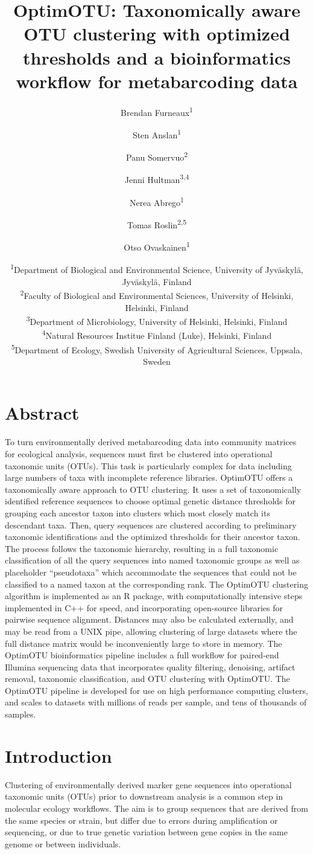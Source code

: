 \documentclass[
]{article}
\title{OptimOTU: Taxonomically aware OTU clustering with optimized thresholds and a bioinformatics workflow for metabarcoding data}
\author{Brendan Furneaux\textsuperscript{1} \and Sten Anslan\textsuperscript{1} \and Panu Somervuo\textsuperscript{2} \and Jenni Hultman\textsuperscript{3,4} \and Nerea Abrego\textsuperscript{1} \and Tomas Roslin\textsuperscript{2,5} \and Otso Ovaskainen\textsuperscript{1}}
\date{\textsuperscript{1}Department of Biological and Environmental Science, University of Jyväskylä, Jyväskylä, Finland\\
\textsuperscript{2}Faculty of Biological and Environmental Sciences, University of Helsinki, Helsinki, Finland\\
\textsuperscript{3}Department of Microbiology, University of Helsinki, Helsinki, Finland\\
\textsuperscript{4}Natural Resources Institue Finland (Luke), Helsinki, Finland\\
\textsuperscript{5}Department of Ecology, Swedish University of Agricultural Sciences, Uppsala, Sweden}
\begin{document}
\maketitle

\section*{Abstract}\label{abstract}

To turn environmentally derived metabarcoding data into community matrices for ecological analysis, sequences must first be clustered into operational taxonomic units (OTUs).
This task is particularly complex for data including large numbers of taxa with incomplete reference libraries.
OptimOTU offers a taxonomically aware approach to OTU clustering.
It uses a set of taxonomically identified reference sequences to choose optimal genetic distance thresholds for grouping each ancestor taxon into clusters which most closely match its descendant taxa.
Then, query sequences are clustered according to preliminary taxonomic identifications and the optimized thresholds for their ancestor taxon.
The process follows the taxonomic hierarchy, resulting in a full taxonomic classification of all the query sequences into named taxonomic groups as well as placeholder ``pseudotaxa'' which accommodate the sequences that could not be classified to a named taxon at the corresponding rank.
The OptimOTU clustering algorithm is implemented as an R package, with computationally intensive steps implemented in C++ for speed, and incorporating open-source libraries for pairwise sequence alignment.
Distances may also be calculated externally, and may be read from a UNIX pipe, allowing clustering of large datasets where the full distance matrix would be inconveniently large to store in memory.
The OptimOTU bioinformatics pipeline includes a full workflow for paired-end Illumina sequencing data that incorporates quality filtering, denoising, artifact removal, taxonomic classification, and OTU clustering with OptimOTU.
The OptimOTU pipeline is developed for use on high performance computing clusters, and scales to datasets with millions of reads per sample, and tens of thousands of samples.

\section{Introduction}\label{introduction}

Clustering of environmentally derived marker gene sequences into operational taxonomic units (OTUs) prior to downstream analysis is a common step in molecular ecology workflows.
The aim is to group sequences that are derived from the same species or strain, but differ due to errors during amplification or sequencing, or due to true genetic variation between gene copies in the same genome or between individuals.
\end{document}
